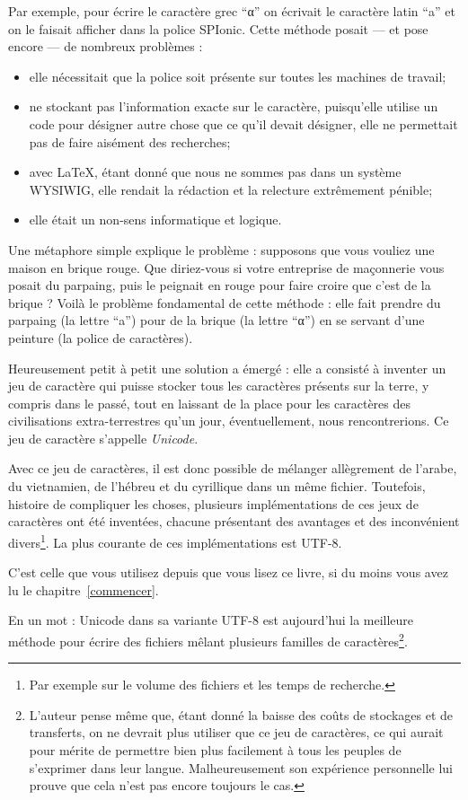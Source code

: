 Par exemple, pour écrire le caractère grec \enquote{α} on écrivait le caractère latin \enquote{a} et on le faisait afficher dans la police SPIonic. Cette méthode posait --- et pose encore --- de nombreux problèmes :
\begin{itemize}
\item elle nécessitait que la police soit présente sur toutes les machines de travail;
\item ne stockant pas l'information exacte sur le caractère, puisqu'elle utilise un code pour désigner autre chose que ce qu'il devait désigner, elle ne permettait pas  de faire aisément des recherches;
\item avec \LaTeX, étant donné que nous ne sommes pas dans un système WYSIWIG, elle rendait la rédaction et la relecture extrêmement pénible;
\item elle était un non-sens informatique et logique. 
\end{itemize}

Une métaphore simple explique le problème : supposons que vous vouliez une maison en brique rouge. Que diriez-vous si votre entreprise de maçonnerie vous posait du parpaing, puis le peignait en rouge pour faire croire que c'est de la brique ? Voilà le problème fondamental de cette méthode : elle fait prendre du parpaing (la lettre \enquote{a}) pour de la brique (la lettre \enquote{α}) en se servant d'une peinture (la police de caractères).

Heureusement petit à petit une solution a émergé : elle a consisté à inventer un jeu de caractère qui puisse stocker tous les caractères présents sur la terre, y compris dans le passé, tout en laissant de la place pour les caractères des civilisations extra-terrestres qu'un jour, éventuellement, nous rencontrerions. Ce jeu de caractère s'appelle \emph{Unicode}.

Avec ce jeu de caractères, il est donc possible de mélanger allègrement de l'arabe, du vietnamien, de l'hébreu et du cyrillique dans un même fichier. Toutefois, histoire de compliquer les choses, plusieurs implémentations de ces jeux de caractères ont été inventées, chacune présentant des avantages et des inconvénient divers\footnote{Par exemple sur le volume des fichiers et les temps de recherche.}. La plus courante de ces implémentations est UTF-8.

C'est celle que vous utilisez depuis que vous lisez ce livre, si du moins vous avez lu le chapitre~\ref{commencer}.

En un mot : Unicode dans sa variante UTF-8 est aujourd'hui la meilleure méthode pour écrire des fichiers mêlant plusieurs familles de caractères\footnote{L'auteur pense même que, étant donné la baisse des coûts de stockages et de transferts, on ne devrait plus utiliser que ce jeu de caractères, ce qui aurait pour mérite de permettre bien plus facilement à tous les peuples de s'exprimer dans leur langue. Malheureusement son expérience personnelle lui prouve que cela n'est pas encore toujours le cas.}.

